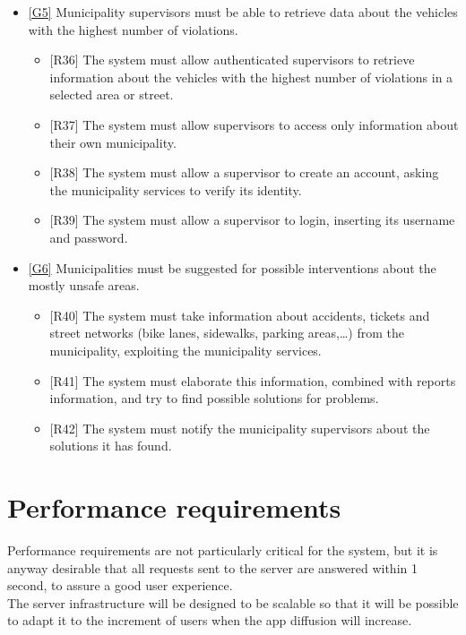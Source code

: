 \documentclass[a4paper]{report}
\begin{document}
\begin{itemize}
\item  \hyperref[G5]{[G5]} Municipality supervisors must be able to retrieve data about the vehicles with the highest number of violations.
\begin{itemize}
\item {[R36]}	\label{R36}The system must allow authenticated supervisors to retrieve information about the vehicles with the highest number of violations in a selected area or street.
\item {[R37]}	\label{R37}The system must allow supervisors to access only information about their own municipality.
\item {[R38]}	\label{R38}The system must allow a supervisor to create an account, asking the municipality services to verify its identity.
\item {[R39]}	\label{R39}The system must allow a supervisor to login, inserting its username and password.
\end{itemize}
\item  \hyperref[G6]{[G6]} Municipalities must be suggested for possible interventions about the mostly unsafe areas.
\begin{itemize}
\item {[R40]}	\label{R40}The system must take information about accidents, tickets and street networks (bike lanes, sidewalks, parking areas,…) from the municipality, exploiting the municipality services.
\item {[R41]}	\label{R41}The system must elaborate this information, combined with reports information, and try to find possible solutions for problems.
\item {[R42]}	\label{R42}The system must notify the municipality supervisors about the solutions it has found.
\end{itemize}
\end{itemize}


\section{Performance requirements}
Performance requirements are not particularly critical for the system, but it is anyway desirable that all requests sent to the server are answered within 1 second, to assure a good user experience. \\
The server infrastructure will be designed to be scalable so that it will be possible to adapt it to the increment of users when the app diffusion will increase.
\end{document}
